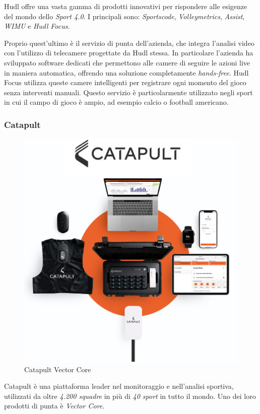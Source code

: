 \noindent Hudl offre una vasta gamma di prodotti innovativi per rispondere alle esigenze del mondo dello \textit{Sport 4.0}. I principali sono: \textit{Sportscode}, \textit{Volleymetrics}, \textit{Assist}, \textit{WIMU} e \textit{Hudl Focus}.

\noindent Proprio quest'ultimo è il servizio di punta dell'azienda, che integra l'analisi video con l'utilizzo di telecamere progettate da Hudl stessa.  In particolare l'azienda ha sviluppato software dedicati che permettono alle camere di seguire le azioni live in maniera automatica, offrendo una soluzione completamente \textit{hands-free}. Hudl Focus utilizza queste camere intelligenti per registrare ogni momento del gioco senza interventi manuali. Questo servizio è particolarmente utilizzato negli sport in cui il campo di gioco è ampio, ad esempio calcio o football americano.




\subsubsection{Catapult}
\label{subsubsec:catapult}
\begin{figure}
    \centering
    \vspace{-15px}
    \includegraphics[scale=0.48]{img/catapult.png}
    \caption{Catapult Vector Core}
    \label{fig:Catapult Vector Core}
\end{figure}
Catapult \cite{Catapult} è una piattaforma leader nel monitoraggio e nell'analisi sportiva, utilizzati da oltre \textit{4.200 squadre} in più di \textit{40 sport} in tutto il mondo. Uno dei loro prodotti di punta è \textit{Vector Core}.

